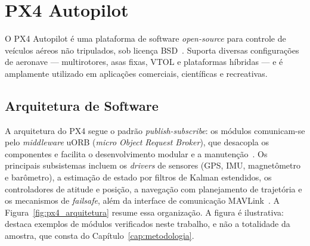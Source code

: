 \section{PX4 Autopilot}

O PX4 Autopilot é uma plataforma de software \textit{open-source} para controle de
veículos aéreos não tripulados, sob licença BSD~\cite{PX4_GitHub,
PX4_Documentation}. Suporta diversas configurações de aeronave --- multirotores,
asas fixas, VTOL e plataformas híbridas --- e é amplamente utilizado em aplicações
comerciais, científicas e recreativas.

\subsection{Arquitetura de Software}

A arquitetura do PX4 segue o padrão \textit{publish-subscribe}: os módulos
comunicam-se pelo \textit{middleware} uORB (\textit{micro Object Request Broker}),
que desacopla os componentes e facilita o desenvolvimento modular e a
manutenção~\cite{PX4_Documentation}. Os principais subsistemas incluem os
\textit{drivers} de sensores (GPS, IMU, magnetômetro e barômetro), a estimação de
estado por filtros de Kalman estendidos, os controladores de atitude e posição, a
navegação com planejamento de trajetória e os mecanismos de \textit{failsafe},
além da interface de comunicação MAVLink~\cite{PX4_Documentation}. A
Figura~\ref{fig:px4_arquitetura} resume essa organização. A figura é ilustrativa: destaca
exemplos de módulos verificados neste trabalho, e não a totalidade da amostra,
que consta do Capítulo~\ref{cap:metodologia}.

